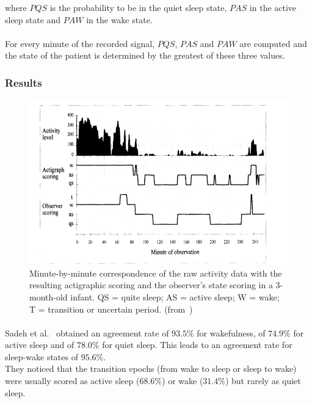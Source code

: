 \documentclass[a4paper,12pt]{article}
\begin{document}
where $PQS$ is the probability to be in the quiet sleep state, $PAS$ in the active sleep state and $PAW$ in the wake state.

\paragraph{}
For every minute of the recorded signal, $PQS$, $PAS$ and $PAW$ are computed and the state of the patient is determined by the greatest of these three values.

\subsubsection{Results}

\begin{figure}[H]
\centering
\includegraphics[scale=0.5]{Images/SadehResults1.png}
\caption{Minute-by-minute correspondence of the raw activity data with the resulting actigraphic scoring and the observer's state scoring in a 3-month-old infant. QS = quite sleep; AS = active sleep; W = wake; T = transition or uncertain period. (from~\cite{Sadeh1995})}
\label{SadehResults1}
\end{figure}

\paragraph{}
Sadeh et al.~\cite{Sadeh1995} obtained an agreement rate of $93.5\%$ for wakefulness, of $74.9\%$ for active sleep and of $78.0\%$ for quiet sleep. This leads to an agreement rate for sleep-wake states of $95.6\%$. \\
They noticed that the transition epochs (from wake to sleep or sleep to wake) were usually scored as active sleep ($68.6\%$) or wake ($31.4\%$) but rarely as quiet sleep.
\end{document}

